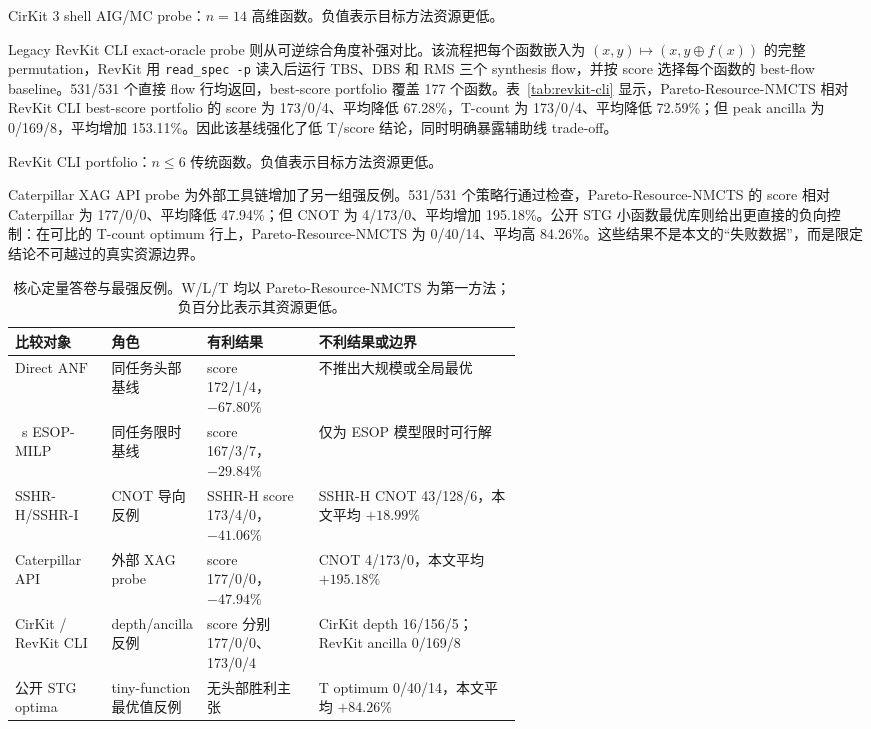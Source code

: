 \documentclass[UTF8,fontset=fandol,11pt]{ctexart}
\newcommand{\method}{Resource-NMCTS}
\newcommand{\anf}{\ensuremath{\mathrm{ANF}}}
\newcommand{\xor}{\ensuremath{\oplus}}
\begin{document}
\begin{table}[H]
\centering
\small
\caption{CirKit 3 shell AIG/MC probe：$n=14$ 高维函数。负值表示目标方法资源更低。}
\label{tab:cirkit-highdim}

\end{table}

Legacy RevKit CLI exact-oracle probe 则从可逆综合角度补强对比。该流程把每个函数嵌入为 $(x,y)\mapsto(x,y\xor f(x))$ 的完整 permutation，RevKit 用 \texttt{read\_spec -p} 读入后运行 TBS、DBS 和 RMS 三个 synthesis flow，并按 score 选择每个函数的 best-flow baseline。531/531 个直接 flow 行均返回，best-score portfolio 覆盖 177 个函数。表~\ref{tab:revkit-cli} 显示，Pareto-\method{} 相对 RevKit CLI best-score portfolio 的 score 为 173/0/4、平均降低 67.28\%，T-count 为 173/0/4、平均降低 72.59\%；但 peak ancilla 为 0/169/8，平均增加 153.11\%。因此该基线强化了低 T/score 结论，同时明确暴露辅助线 trade-off。

\begin{table}[H]
\centering
\small
\caption{RevKit CLI portfolio：$n\leq6$ 传统函数。负值表示目标方法资源更低。}
\label{tab:revkit-cli}

\end{table}

Caterpillar XAG API probe 为外部工具链增加了另一组强反例。531/531 个策略行通过检查，Pareto-\method{} 的 score 相对 Caterpillar 为 177/0/0、平均降低 47.94\%；但 CNOT 为 4/173/0、平均增加 195.18\%。公开 STG 小函数最优库则给出更直接的负向控制：在可比的 T-count optimum 行上，Pareto-\method{} 为 0/40/14、平均高 84.26\%。这些结果不是本文的“失败数据”，而是限定结论不可越过的真实资源边界。

\begin{table}[H]
\centering
\scriptsize
\setlength{\tabcolsep}{2.5pt}
\renewcommand{\arraystretch}{1.06}
\caption{核心定量答卷与最强反例。W/L/T 均以 Pareto-\method{} 为第一方法；负百分比表示其资源更低。}
\label{tab:comparison-answer-zh}
\begin{tabularx}{\linewidth}{>{\raggedright\arraybackslash}p{0.19\linewidth}>{\raggedright\arraybackslash}p{0.18\linewidth}>{\raggedright\arraybackslash}p{0.22\linewidth}>{\raggedright\arraybackslash}X}
\toprule
比较对象 & 角色 & 有利结果 & 不利结果或边界 \\
\midrule
Direct \anf{} & 同任务头部基线 & score 172/1/4，$-67.80\%$ & 不推出大规模或全局最优 \\
10~s ESOP-MILP & 同任务限时基线 & score 167/3/7，$-29.84\%$ & 仅为 ESOP 模型限时可行解 \\
SSHR-H/SSHR-I & CNOT 导向反例 & SSHR-H score 173/4/0，$-41.06\%$ & SSHR-H CNOT 43/128/6，本文平均 $+18.99\%$ \\
Caterpillar API & 外部 XAG probe & score 177/0/0，$-47.94\%$ & CNOT 4/173/0，本文平均 $+195.18\%$ \\
CirKit / RevKit CLI & depth/ancilla 反例 & score 分别 177/0/0、173/0/4 & CirKit depth 16/156/5；RevKit ancilla 0/169/8 \\
公开 STG optima & tiny-function 最优值反例 & 无头部胜利主张 & T optimum 0/40/14，本文平均 $+84.26\%$ \\
\bottomrule
\end{tabularx}
\end{table}
\end{document}
